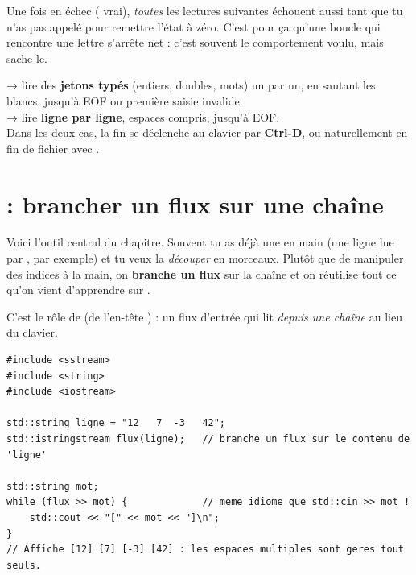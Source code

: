 \documentclass[11pt]{article}
\begin{document}
\begin{piege}
Une fois \code{>>} en échec ( vrai), \emph{toutes} les lectures
suivantes échouent aussi tant que tu n'as pas appelé  pour
remettre l'état à zéro. C'est pour ça qu'une boucle 
qui rencontre une lettre s'arrête net : c'est souvent le comportement voulu, mais
sache-le.
\end{piege}

\begin{aretenir}
 → lire des \textbf{jetons typés} (entiers, doubles,
mots) un par un, en sautant les blancs, jusqu'à EOF ou première saisie invalide.\\
 → lire \textbf{ligne par ligne},
espaces compris, jusqu'à EOF.\\
Dans les deux cas, la fin se déclenche au clavier par \textbf{Ctrl-D}, ou
naturellement en fin de fichier avec .
\end{aretenir}

\section{ : brancher un flux sur une chaîne}

Voici l'outil central du chapitre. Souvent tu as déjà une  en
main (une ligne lue par , par exemple) et tu veux la \emph{découper}
en morceaux. Plutôt que de manipuler des indices à la main, on \textbf{branche un
flux} sur la chaîne et on réutilise tout ce qu'on vient d'apprendre sur \code{>>}.

C'est le rôle de  (de l'en-tête ) : un
flux d'entrée qui lit \emph{depuis une chaîne} au lieu du clavier.

\begin{lstlisting}
#include <sstream>
#include <string>
#include <iostream>

std::string ligne = "12   7  -3   42";
std::istringstream flux(ligne);   // branche un flux sur le contenu de 'ligne'

std::string mot;
while (flux >> mot) {             // meme idiome que std::cin >> mot !
    std::cout << "[" << mot << "]\n";
}
// Affiche [12] [7] [-3] [42] : les espaces multiples sont geres tout seuls.
\end{lstlisting}
\end{document}
